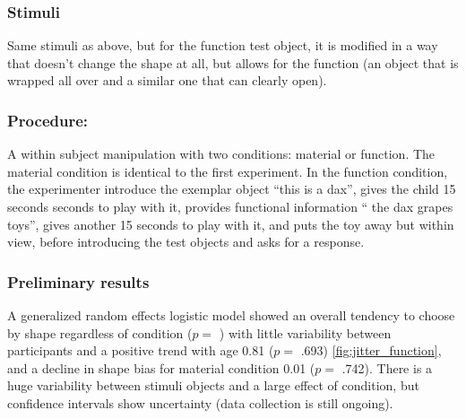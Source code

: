 \documentclass[10pt, letterpaper]{article}
\begin{document}
\hypertarget{stimuli}{%
\subsubsection{Stimuli}\label{stimuli}}

Same stimuli as above, but for the function test object, it is modified
in a way that doesn't change the shape at all, but allows for the
function (an object that is wrapped all over and a similar one that can
clearly open).

\hypertarget{procedure}{%
\subsubsection{Procedure:}\label{procedure}}

A within subject manipulation with two conditions: material or function.
The material condition is identical to the first experiment. In the
function condition, the experimenter introduce the exemplar object
``this is a dax'', gives the child 15 seconds seconds to play with it,
provides functional information `` the dax grapes toys'', gives another
15 seconds to play with it, and puts the toy away but within view,
before introducing the test objects and asks for a response.

\hypertarget{preliminary-results}{%
\subsubsection{Preliminary results}\label{preliminary-results}}

A generalized random effects logistic model showed an overall tendency
to choose by shape regardless of condition (\(p=\) ) with little
variability between participants and a positive trend with age 0.81
(\(p=\) .693) \ref{fig:jitter_function}, and a decline in shape bias for
material condition 0.01 (\(p=\) .742). There is a huge variability
between stimuli objects and a large effect of condition, but confidence
intervals show uncertainty (data collection is still ongoing).
\end{document}
